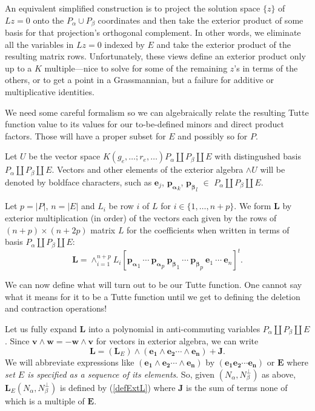 \documentclass[Unicode]{cedram-alco}
\newcommand{\ext}[1]{\ensuremath{\mathbf{#1}}}
\newcommand{\dunion}{\coprod}
\begin{document}
An equivalent simplified construction is to project the solution space $\{z\}$ of $Lz=0$ onto
the $P_\alpha\cup P_\beta$ coordinates and then take the exterior product of some basis
for that projection's orthogonal complement.  In other words, we eliminate all the variables
in $Lz=0$ indexed by $E$ and take the exterior product of the resulting matrix rows.
Unfortunately, these views define an exterior product only
up to a $K$ multiple---nice to solve for some of the remaining $z$'s in terms of
the others, or to get a point in a Grassmannian, but a failure
for additive or multiplicative identities.

We need 
some careful formalism so we can algebraically relate the resulting Tutte function value
to its values for our to-be-defined minors and direct product factors.  Those 
will have a proper subset for $E$ and possibly so for $P$.

Let $U$ be the vector space $K(g_e,\ldots;r_e,\ldots)P_\alpha
\dunion P_\beta \dunion E$ with distingushed basis $P_\alpha
\dunion P_\beta \dunion E$.  Vectors and other elements of the
exterior algebra $\wedge U$ will be denoted by boldface
characters, such as $\ext{e}_j$, $\ext{p_\alpha}_k$,
$\ext{p_\beta}_l$ $\in$ $P_\alpha \dunion P_\beta \dunion E$.
    
Let $p = |P|$, $n=|E|$ and $L_i$ be row $i$ of $L$ for $i\in\{1,\ldots,n+p\}$.
We form $\ext{L}$ by exterior multiplication (in order) of the vectors each given by the
rows of $(n+p)\times (n+2p)$ matrix $L$ for the coefficients when written in terms of
basis $P_\alpha \dunion P_\beta \dunion E$:
\begin{equation}\label{defExtL}
  \ext{L} = \wedge_{i=1}^{n+p}L_i[\ext{p_\alpha}_1\ \cdots\ \ext{p_\alpha}_{p}\ \ext{p_\beta}_1\ \cdots\ \ext{p_\beta}_{p}\
    \ext{e}_1\ \cdots\ \ext{e}_{n}]^t. 
\end{equation}

We can now define what will turn out to be our Tutte function.  One cannot say what it means for
it to be a Tutte function until we get to defining the deletion and contraction operations!

Let us fully expand $\ext{L}$ into a polynomial in anti-commuting variables
$P_\alpha \dunion P_\beta \dunion E$.  Since $\ext{v}\wedge\ext{w}=-\ext{w}\wedge\ext{v}$ for vectors in
exterior algebra, we can write
\[
\ext{L} = (\ext{L}_E)\wedge (\ext{e_1}\wedge\ext{e_2}\cdots\wedge\ext{e_n}) + \ext{J}.
\]
We will abbreviate expressions like $(\ext{e_1}\wedge\ext{e_2}\cdots\wedge\ext{e_n})$ by
$(\ext{e_1}\ext{e_2}\cdots\ext{e_n})$ or $\ext{E}$ where \emph{set $E$ is specified as a sequence of its elements}.
So, given $(N_\alpha,N_\beta^\perp)$ as above, $\ext{L}_E(N_\alpha,N_\beta^\perp)$ is defined by (\ref{defExtL}) where
$\ext{J}$ is the sum of terms none of which is a multiple of $\ext{E}$.
\end{document}
